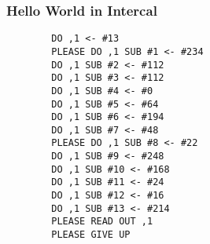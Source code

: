 \begin{frame}[fragile]
    \frametitle{Hello World in Intercal}
    \begin{verbatim}
        DO ,1 <- #13
        PLEASE DO ,1 SUB #1 <- #234
        DO ,1 SUB #2 <- #112
        DO ,1 SUB #3 <- #112
        DO ,1 SUB #4 <- #0
        DO ,1 SUB #5 <- #64
        DO ,1 SUB #6 <- #194
        DO ,1 SUB #7 <- #48
        PLEASE DO ,1 SUB #8 <- #22
        DO ,1 SUB #9 <- #248
        DO ,1 SUB #10 <- #168
        DO ,1 SUB #11 <- #24
        DO ,1 SUB #12 <- #16
        DO ,1 SUB #13 <- #214
        PLEASE READ OUT ,1
        PLEASE GIVE UP
    \end{verbatim}
\end{frame}
